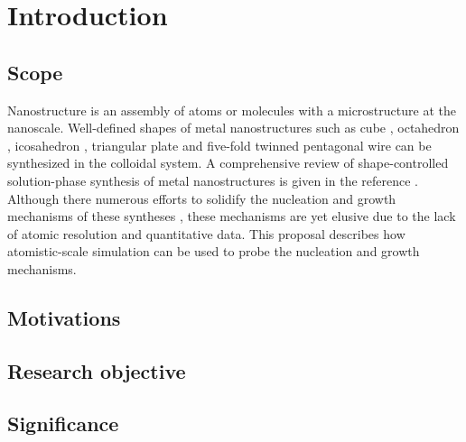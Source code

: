 \section{Introduction}

\subsection{Scope}

Nanostructure is an assembly of atoms or molecules with a microstructure at the nanoscale. Well-defined shapes of metal nanostructures such as cube \cite{Im_2005}, octahedron \cite{Xia_2012}, icosahedron \cite{Xiong_2007}, triangular plate \cite{Lofton_2005} and five-fold twinned pentagonal wire \cite{Tsuji_2008} can be synthesized in the colloidal system. A comprehensive review of shape-controlled solution-phase synthesis of metal nanostructures is given in the reference \cite{Xia_2008}. Although there numerous efforts to solidify the nucleation and growth mechanisms of these syntheses \cite{Lofton_2005,Mariscal_2012,Park_2013,Viswanath_2009,Liao_2014,Chang_2011,Murph_2015}, these mechanisms are yet elusive due to the lack of atomic resolution and quantitative data. This proposal describes how atomistic-scale simulation can be used to probe the nucleation and growth mechanisms.

\subsection{Motivations}

\subsection{Research objective}

\subsection{Significance}